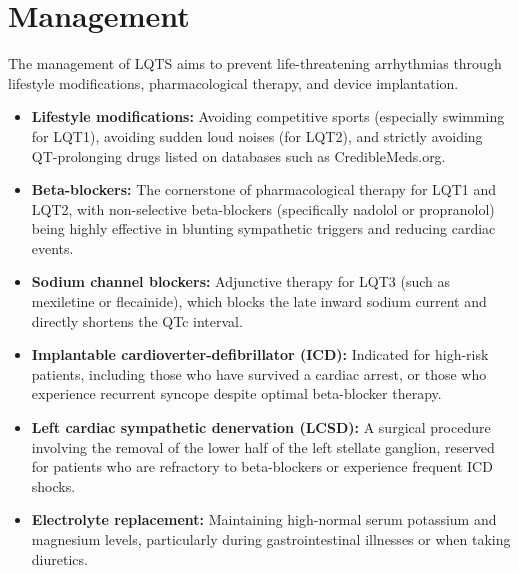 \section*{Management}
The management of LQTS aims to prevent life-threatening arrhythmias through lifestyle modifications, pharmacological therapy, and device implantation.
\begin{itemize}
    \item \textbf{Lifestyle modifications:} Avoiding competitive sports (especially swimming for LQT1), avoiding sudden loud noises (for LQT2), and strictly avoiding QT-prolonging drugs listed on databases such as CredibleMeds.org.
    \item \textbf{Beta-blockers:} The cornerstone of pharmacological therapy for LQT1 and LQT2, with non-selective beta-blockers (specifically nadolol or propranolol) being highly effective in blunting sympathetic triggers and reducing cardiac events.
    \item \textbf{Sodium channel blockers:} Adjunctive therapy for LQT3 (such as mexiletine or flecainide), which blocks the late inward sodium current and directly shortens the QTc interval.
    \item \textbf{Implantable cardioverter-defibrillator (ICD):} Indicated for high-risk patients, including those who have survived a cardiac arrest, or those who experience recurrent syncope despite optimal beta-blocker therapy.
    \item \textbf{Left cardiac sympathetic denervation (LCSD):} A surgical procedure involving the removal of the lower half of the left stellate ganglion, reserved for patients who are refractory to beta-blockers or experience frequent ICD shocks.
    \item \textbf{Electrolyte replacement:} Maintaining high-normal serum potassium and magnesium levels, particularly during gastrointestinal illnesses or when taking diuretics.
\end{itemize}

